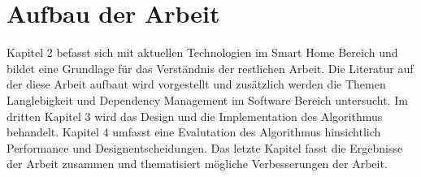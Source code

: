 \section{Aufbau der Arbeit}

Kapitel 2 befasst sich mit aktuellen Technologien im Smart Home Bereich und bildet eine Grundlage für das Verständnis der
restlichen Arbeit. Die Literatur auf der diese Arbeit aufbaut wird vorgestellt und zusätzlich werden die Themen Langlebigkeit
und Dependency Management im Software Bereich untersucht.
Im dritten Kapitel 3 wird das Design und die Implementation des Algorithmus behandelt.
Kapitel 4 umfasst eine Evalutation des Algorithmus hinsichtlich Performance und Designentscheidungen.
Das letzte Kapitel fasst die Ergebnisse der Arbeit zusammen und thematisiert mögliche Verbesserungen der Arbeit.


